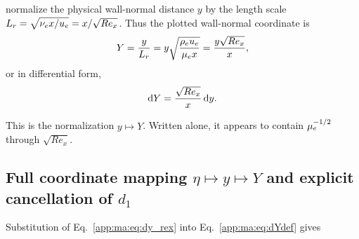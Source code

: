 \maAppName{} normalize the physical wall-normal distance \(y\) by the length scale \(L_r=\sqrt{\nu_e x/u_e}=x/\sqrt{Re_x}\). Thus the plotted wall-normal coordinate is
\begin{equation}
  Y
  =
  \frac{y}{L_r}
  =
  y\sqrt{\frac{\rho_eu_e}{\mu_e x}}
  =
  \frac{y\sqrt{Re_x}}{x},
  \label{app:ma:eq:Ydef}
\end{equation}
or in differential form,
\begin{equation}
  \mathrm{d} Y
  =
  \frac{\sqrt{Re_x}}{x}\,\mathrm{d} y.
  \label{app:ma:eq:dYdef}
\end{equation}

This is the \maAppName{} normalization \(y\mapsto Y\). Written alone, it appears to contain \(\mu_e^{-1/2}\) through \(\sqrt{Re_x}\).

\subsection{\texorpdfstring{Full coordinate mapping \(\eta \mapsto y \mapsto Y\) and explicit cancellation of \(d_1\)}{Full coordinate mapping eta to y to Y and explicit cancellation of d1}}

Substitution of Eq.~\eqref{app:ma:eq:dy_rex} into Eq.~\eqref{app:ma:eq:dYdef} gives

